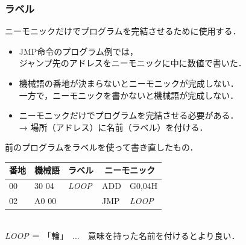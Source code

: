 \documentclass{beamer}                 %
\begin{document}
\begin{frame}
  \frametitle{ラベル}
  ニーモニックだけでプログラムを完結させるために使用する．
  \vfill
  \begin{itemize}
  \item JMP命令のプログラム例では，\\
    ジャンプ先のアドレスをニーモニックに中に数値で書いた．
  \vfill
  \item 機械語の番地が決まらないとニーモニックが完成しない．\\
    一方で，ニーモニックを書かないと機械語が完成しない．
  \vfill
  \item ニーモニックだけでプログラムを完結させる必要がある．\\
    →  場所（アドレス）に名前（ラベル）を付ける．
  \end{itemize}
  \vfill

  前のプログラムをラベルを使って書き直したもの．
  {\ttfamily\small\begin{center}
    \begin{tabular}{|l|l|l|l l|} \hline
      番地 & 機械語 & ラベル & \multicolumn{2}{|c|}{ニーモニック} \\
      \hline
      00 & 30 04 & \emph{LOOP} & ADD  & G0,04H      \\
      02 & A0 00 &             & JMP  & \emph{LOOP} \\
      \hline
    \end{tabular}\\
    \emph{LOOP} ＝ 「輪」　...　意味を持った名前を付けるとより良い．
  \end{center}}
  \vfill
\end{frame}
\end{document}
